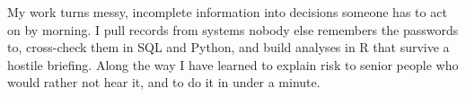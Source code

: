 
My work turns messy, incomplete information into decisions someone has to act on by morning. I pull records from systems nobody else remembers the passwords to, cross-check them in SQL and Python, and build analyses in R that survive a hostile briefing. Along the way I have learned to explain risk to senior people who would rather not hear it, and to do it in under a minute.
